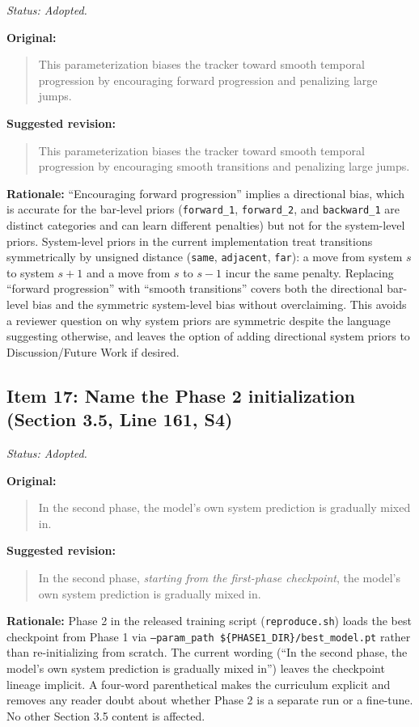 \documentclass{article}
\begin{document}
\textit{Status: Adopted.}

\textbf{Original:}
\begin{quote}
This parameterization biases the tracker toward smooth temporal progression by encouraging forward progression and penalizing large jumps.
\end{quote}

\textbf{Suggested revision:}
\begin{quote}
This parameterization biases the tracker toward smooth temporal progression by encouraging smooth transitions and penalizing large jumps.
\end{quote}

\textbf{Rationale:}
``Encouraging forward progression'' implies a directional bias, which is accurate for the bar-level priors (\texttt{forward\_1}, \texttt{forward\_2}, and \texttt{backward\_1} are distinct categories and can learn different penalties) but not for the system-level priors. System-level priors in the current implementation treat transitions symmetrically by unsigned distance (\texttt{same}, \texttt{adjacent}, \texttt{far}): a move from system $s$ to system $s+1$ and a move from $s$ to $s-1$ incur the same penalty. Replacing ``forward progression'' with ``smooth transitions'' covers both the directional bar-level bias and the symmetric system-level bias without overclaiming. This avoids a reviewer question on why system priors are symmetric despite the language suggesting otherwise, and leaves the option of adding directional system priors to Discussion/Future Work if desired.

\subsection*{Item 17: Name the Phase 2 initialization (Section 3.5, Line 161, S4)}

\textit{Status: Adopted.}

\textbf{Original:}
\begin{quote}
In the second phase, the model's own system prediction is gradually mixed in.
\end{quote}

\textbf{Suggested revision:}
\begin{quote}
In the second phase, \emph{starting from the first-phase checkpoint}, the model's own system prediction is gradually mixed in.
\end{quote}

\textbf{Rationale:}
Phase 2 in the released training script (\texttt{reproduce.sh}) loads the best checkpoint from Phase 1 via \texttt{--param\_path \$\{PHASE1\_DIR\}/best\_model.pt} rather than re-initializing from scratch. The current wording (``In the second phase, the model's own system prediction is gradually mixed in'') leaves the checkpoint lineage implicit. A four-word parenthetical makes the curriculum explicit and removes any reader doubt about whether Phase 2 is a separate run or a fine-tune. No other Section 3.5 content is affected.
\end{document}
